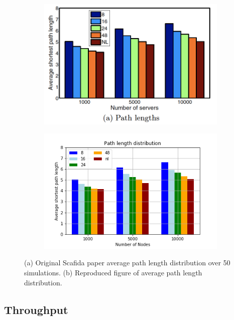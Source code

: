 \begin{figure}[t]
\begin{subfigure}[b]{0.5\textwidth}
\centering
 \vspace{3pt}%
   \includegraphics[width=0.95\linewidth]{figures/path_lengths_original}
   \caption{}
   \label{fig:Ng1} 
\end{subfigure}

\begin{subfigure}[b]{0.5\textwidth}
\centering
   \includegraphics[width=0.95\linewidth]{figures/path_lengths}
   \caption{}
   \label{fig:Ng2}
\end{subfigure}

\caption{(a) Original Scafida paper average path length distribution over 50 simulations. (b) Reproduced figure of average path length distribution.}
\end{figure}

\subsection{Throughput}

